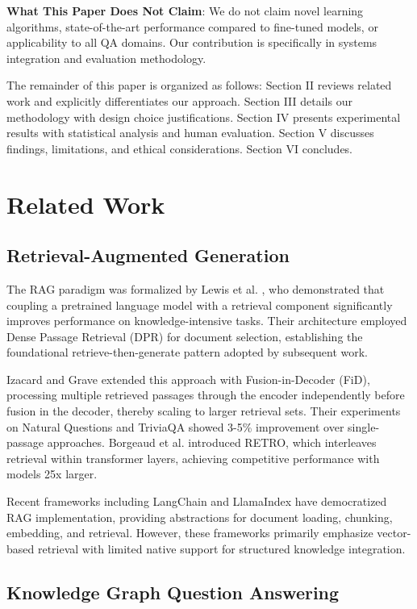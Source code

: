 \documentclass[conference]{IEEEtran}
\begin{document}
\textbf{What This Paper Does Not Claim}: We do not claim novel learning algorithms, state-of-the-art performance compared to fine-tuned models, or applicability to all QA domains. Our contribution is specifically in systems integration and evaluation methodology.

The remainder of this paper is organized as follows: Section II reviews related work and explicitly differentiates our approach. Section III details our methodology with design choice justifications. Section IV presents experimental results with statistical analysis and human evaluation. Section V discusses findings, limitations, and ethical considerations. Section VI concludes.

\section{Related Work}

\subsection{Retrieval-Augmented Generation}

The RAG paradigm was formalized by Lewis et al. \cite{lewis2020retrieval}, who demonstrated that coupling a pretrained language model with a retrieval component significantly improves performance on knowledge-intensive tasks. Their architecture employed Dense Passage Retrieval (DPR) for document selection, establishing the foundational retrieve-then-generate pattern adopted by subsequent work.

Izacard and Grave \cite{izacard2021leveraging} extended this approach with Fusion-in-Decoder (FiD), processing multiple retrieved passages through the encoder independently before fusion in the decoder, thereby scaling to larger retrieval sets. Their experiments on Natural Questions and TriviaQA showed 3-5\% improvement over single-passage approaches. Borgeaud et al. \cite{borgeaud2022improving} introduced RETRO, which interleaves retrieval within transformer layers, achieving competitive performance with models 25x larger.

Recent frameworks including LangChain \cite{chase2022langchain} and LlamaIndex have democratized RAG implementation, providing abstractions for document loading, chunking, embedding, and retrieval. However, these frameworks primarily emphasize vector-based retrieval with limited native support for structured knowledge integration.

\subsection{Knowledge Graph Question Answering}
\end{document}
